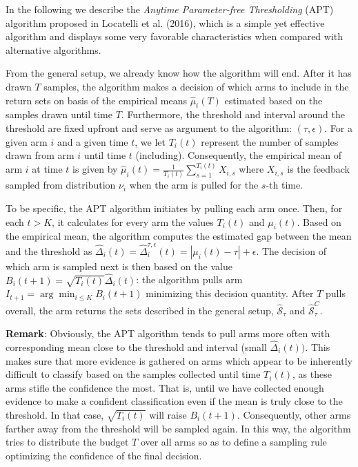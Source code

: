 \documentclass[12pt,]{article}
\begin{document}
\DecMargin{1em}

In the following we describe the \emph{Anytime Parameter-free
Thresholding} (APT) algorithm proposed in Locatelli et al. (2016), which
is a simple yet effective algorithm and displays some very favorable
characteristics when compared with alternative algorithms.

From the general setup, we already know how the algorithm will end.
After it has drawn \(T\) samples, the algorithm makes a decision of
which arms to include in the return sets on basis of the empirical means
\(\hat{\mu}_i(T)\) estimated based on the samples drawn until time
\(T\). Furthermore, the threshold and interval around the threshold are
fixed upfront and serve as argument to the algorithm:
\((\tau, \epsilon)\). For a given arm \(i\) and a given time \(t\), we
let \(T_i(t)\) represent the number of samples drawn from arm \(i\)
until time \(t\) (including). Consequently, the empirical mean of arm
\(i\) at time \(t\) is given by
\(\hat{\mu}_i(t) = \frac{1}{T_i(t)} \sum_{s=1}^{T_i(t)} X_{i,s}\) where
\(X_{i,s}\) is the feedback sampled from distribution \(\nu_i\) when the
arm is pulled for the \(s\)-th time.

To be specific, the APT algorithm initiates by pulling each arm once.
Then, for each \(t > K\), it calculates for every arm the values
\(T_i(t)\) and \(\mu_i(t)\). Based on the empirical mean, the algorithm
computes the estimated gap between the mean and the threshold as
\(\hat{\Delta}_i(t) = \hat{\Delta}_i^{\tau, \epsilon}(t) = |\mu_i(t) - \tau| + \epsilon\).
The decision of which arm is sampled next is then based on the value
\(B_i(t+1) = \sqrt{T_i(t)} \hat{\Delta}_i(t)\): the algorithm pulls arm
\(I_{t+1} = \arg \min_{i\leq K} B_i(t+1)\) minimizing this decision
quantity. After \(T\) pulls overall, the arm returns the sets described
in the general setup, \(\hat{\mathcal{S}}_{\tau}\) and
\(\hat{\mathcal{S}}^C_{\tau}\).

\textbf{Remark}: Obviously, the APT algorithm tends to pull arms more
often with corresponding mean close to the threshold and interval (small
\(\hat{\Delta}_i(t))\). This makes sure that more evidence is gathered
on arms which appear to be inherently difficult to classify based on the
samples collected until time \(T_i(t)\), as these arms stifle the
confidence the most. That is, until we have collected enough evidence to
make a confident classification even if the mean is truly close to the
threshold. In that case, \(\sqrt{T_i(t)}\) will raise \(B_i(t+1)\).
Consequently, other arms farther away from the threshold will be sampled
again. In this way, the algorithm tries to distribute the budget \(T\)
over all arms so as to define a sampling rule optimizing the confidence
of the final decision.
\end{document}
